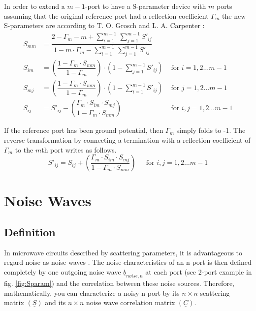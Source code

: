 \documentclass[10pt]{report}
\begin{document}
In order to extend a $m - 1$-port to have a S-parameter device with
$m$ ports assuming that the original reference port had a reflection
coefficient $\Gamma_m$ the new S-parameters are according to
T. O. Grosch and L. A. Carpenter \cite{Grosch}:
\begin{align}
S_{mm} &= \dfrac{2 - \Gamma_m - m + {\displaystyle\sum_{i=1}^{m-1}}\, {\displaystyle\sum_{j=1}^{m-1}} S'_{ij}}{1 - m\cdot \Gamma_m - {\displaystyle\sum_{i=1}^{m-1}}\, {\displaystyle\sum_{j=1}^{m-1}} S'_{ij}}\\
S_{im} &= \left(\dfrac{1 - \Gamma_m\cdot S_{mm}}{1 - \Gamma_m}\right)\cdot \left(1 - \sum_{j=1}^{m-1} S'_{ij}\right) &
\textrm{ for } i = 1,2 \ldots m - 1\\
S_{mj} &= \left(\dfrac{1 - \Gamma_m\cdot S_{mm}}{1 - \Gamma_m}\right)\cdot \left(1 - \sum_{i=1}^{m-1} S'_{ij}\right) &
\textrm{ for } j = 1,2 \ldots m - 1\\
S_{ij} &= S'_{ij} - \left(\dfrac{\Gamma_m\cdot S_{im}\cdot S_{mj}}{1 - \Gamma_m\cdot S_{mm}}\right) &
\textrm{ for } i,j = 1,2 \ldots m - 1
\end{align}

If the reference port has been ground potential, then $\Gamma_m$
simply folds to -1.  The reverse transformation by connecting a
termination with a reflection coefficient of $\Gamma_m$ to the $m$th
port writes as follows.
\begin{equation}
S'_{ij} = S_{ij} + \left(\dfrac{\Gamma_m\cdot S_{im}\cdot S_{mj}}{1 - \Gamma_m\cdot S_{mm}}\right)
\;\;\;\; \textrm{ for } i,j = 1,2 \ldots m - 1
\end{equation}

\chapter{Noise Waves}

\section{Definition}

In microwave circuits described by scattering parameters, it is
advantageous to regard noise as noise waves \cite{Wedge}.  The noise
characteristics of an n-port is then defined completely by one
outgoing noise wave $\underline{b}_{noise,n}$ at each port (see 2-port
example in fig. \ref{fig:Sparam}) and the correlation between these
noise sources.  Therefore, mathematically, you can characterize a
noisy n-port by its $n\times n$ scattering matrix $(\underline{S})$
and its $n\times n$ noise wave correlation matrix $(\underline{C})$.
\end{document}
